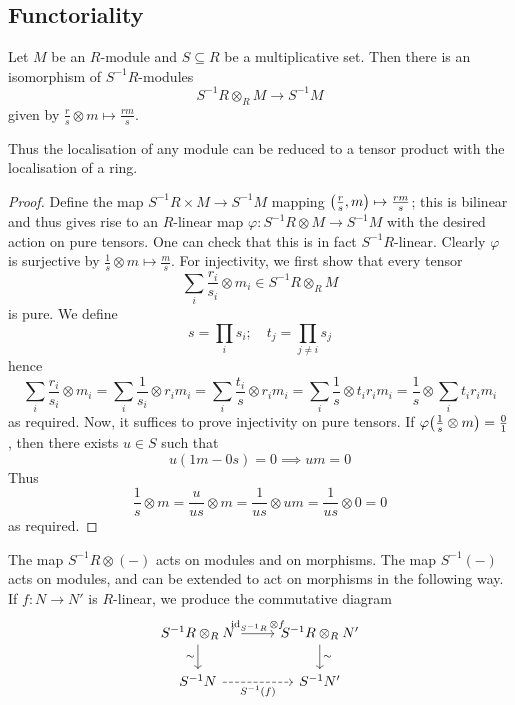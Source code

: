 \subsection{Functoriality}
\begin{proposition}
    Let \( M \) be an \( R \)-module and \( S \subseteq R \) be a multiplicative set.
    Then there is an isomorphism of \( S^{-1}R \)-modules
    \[ S^{-1}R \otimes_R M \to S^{-1}M \]
    given by \( \frac{r}{s} \otimes m \mapsto \frac{rm}{s} \).
\end{proposition}
Thus the localisation of any module can be reduced to a tensor product with the localisation of a ring.
\begin{proof}
    Define the map \( S^{-1}R \times M \to S^{-1}M \) mapping \( \qty(\frac{r}{s}, m) \mapsto \frac{rm}{s} \); this is bilinear and thus gives rise to an \( R \)-linear map \( \varphi : S^{-1}R \otimes M \to S^{-1}M \) with the desired action on pure tensors.
    One can check that this is in fact \( S^{-1} R \)-linear.
    Clearly \( \varphi \) is surjective by \( \frac{1}{s} \otimes m \mapsto \frac{m}{s} \).
    For injectivity, we first show that every tensor
    \[ \sum_i \frac{r_i}{s_i} \otimes m_i \in S^{-1}R \otimes_R M \]
    is pure.
    We define
    \[ s = \prod_i s_i;\quad t_j = \prod_{j \neq i} s_j \]
    hence
    \[ \sum_i \frac{r_i}{s_i} \otimes m_i = \sum_i \frac{1}{s_i} \otimes r_i m_i = \sum_i \frac{t_i}{s} \otimes r_i m_i = \sum_i \frac{1}{s} \otimes t_i r_i m_i = \frac{1}{s} \otimes \sum_i t_i r_i m_i \]
    as required.
    Now, it suffices to prove injectivity on pure tensors.
    If \( \varphi\qty(\frac{1}{s} \otimes m) = \frac{0}{1} \), then there exists \( u \in S \) such that
    \[ u(1m - 0s) = 0 \implies um = 0 \]
    Thus
    \[ \frac{1}{s} \otimes m = \frac{u}{us} \otimes m = \frac{1}{us} \otimes um = \frac{1}{us} \otimes 0 = 0 \]
    as required.
\end{proof}
The map \( S^{-1}R \otimes (-) \) acts on modules and on morphisms.
The map \( S^{-1}(-) \) acts on modules, and can be extended to act on morphisms in the following way.
If \( f : N \to N' \) is \( R \)-linear, we produce the commutative diagram
\[\begin{tikzcd}
	{S^{-1}R \otimes_R N} & {S^{-1}R \otimes_R N'} \\
	{S^{-1}N} & {S^{-1}N'}
	\arrow["{\id_{S^{-1} R} \otimes f}", from=1-1, to=1-2]
	\arrow["\sim", from=1-2, to=2-2]
	\arrow["\sim"', from=1-1, to=2-1]
	\arrow["{S^{-1}(f)}"', dashed, from=2-1, to=2-2]
\end{tikzcd}\]
